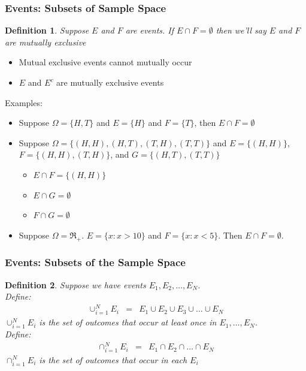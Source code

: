 \documentclass[handout]{beamer}
\newtheorem{defn}{Definition}
\numberwithin{equation}{section}
\begin{document}
\begin{frame}
\frametitle{Events: Subsets of Sample Space}

\begin{defn}
Suppose $E$ and $F$ are events.  If $E \cap F = \emptyset$ then we'll say $E$ and $F$ are \alert{mutually exclusive}
\end{defn}

\pause 

\begin{itemize}
\item[-] Mutual exclusive events cannot mutually occur \pause 
\item[-] $E$ and $E^{c}$ are mutually exclusive events \pause 
\end{itemize}

Examples: \pause 
\begin{itemize}
\item[-] Suppose $\Omega = \{H, T\}$ and $E = \{H\}$ and $F = \{T\}$, then $E \cap F = \emptyset$ \pause 
\item[-] Suppose $\Omega = \{(H, H), (H,T), (T, H), (T,T) \}$ and $E = \{(H,H)\}$,  $F = \{(H, H), (T,H)\}$, and $G = \{(H, T), (T, T) \}$  \pause 
\begin{itemize}
\item[-] $E \cap F = \{(H, H)\}$  \pause 
\item[-] $E \cap G = \emptyset$ \pause 
\item[-] $F \cap G = \emptyset$  \pause
\end{itemize}
\item[-] Suppose $\Omega= \Re_{+}$.  $E = \{x: x> 10\}$ and $F = \{x: x < 5\} $.  Then $E \cap F = \emptyset$.   
\end{itemize}

\end{frame}



\begin{frame}
\frametitle{Events: Subsets of the Sample Space}

\begin{defn}
Suppose we have events $E_{1}, E_{2}, \hdots, E_{N}$.  \\
Define: 
\begin{eqnarray}
\cup_{i=1}^{N} E_{i} & = & E_{1} \cup E_{2} \cup E_{3} \cup \hdots \cup E_{N} \nonumber
\end{eqnarray}
 $\cup_{i=1}^{N} E_{i} $ is the set of outcomes that occur at least once in $E_{1} , \hdots, E_{N}$. \pause \\


Define: 
\begin{eqnarray}
\cap_{i=1}^{N} E_{i} & = & E_{1} \cap E_{2} \cap \hdots \cap E_{N} \nonumber 
\end{eqnarray}
$\cap_{i=1}^{N} E_{i} $ is the set of outcomes that occur in each $E_{i}$


\end{defn}



\end{frame}
\end{document}

